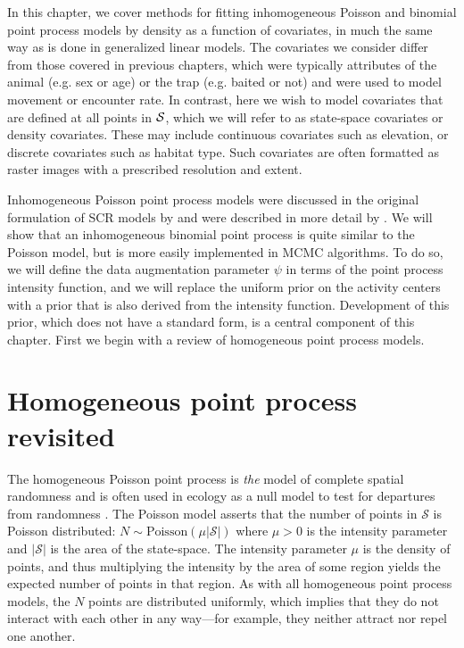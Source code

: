 In this chapter, we cover methods %
for fitting inhomogeneous Poisson and binomial
point process models by density as a
function of covariates, in much the same way as is done in generalized linear
models. The covariates we consider differ
from those covered in previous chapters, which were typically
attributes of the animal (e.g. sex or age) or the trap (e.g. baited or
not) and were used to model movement or encounter
rate. In contrast, here we wish to model covariates that are defined
at all points in $\cal S$, which we will refer to as
state-space covariates or density covariates. These may
include continuous covariates such as elevation, or discrete
covariates such as habitat type. Such covariates are often formatted
as raster images with a prescribed resolution and extent.

Inhomogeneous Poisson point process models were discussed in the original
formulation of SCR models by \citet{efford:2004} and were described in
more detail by \citet{borchers_efford:2008}. We will show that an
inhomogeneous binomial point process is quite similar to the Poisson
model, but is more easily implemented in MCMC algorithms. To do so, we
will define the data augmentation parameter $\psi$ in terms of the point
process intensity function, and we will replace the uniform prior on the
activity centers with a prior that is also derived from the intensity
function. Development of this prior, which does not have a
standard form, is a central component of this chapter. First we
begin with a review of homogeneous point process models.


\section{Homogeneous point process revisited}

The homogeneous Poisson point process is \textit{the} model of complete
spatial randomness and is often used in ecology as a null model
to test for departures from randomness
\citep{cressie:1992, diggle:2003, illian_etal:2008}.
The Poisson model asserts that the number of points in $\mathcal{S}$ is
Poisson distributed: $N \sim \text{Poisson}(\mu|\mathcal{S}|)$ where $\mu>0$ is
the intensity parameter and $|\mathcal{S}|$ is the area of the
state-space. The intensity parameter $\mu$
is the density of points, and thus multiplying the intensity by the area
of some region yields the expected number of points in that region.
As with all homogeneous point process models, the $N$ points are
distributed uniformly, which implies that they do not interact with each other in
any way---for example, they neither attract nor repel one another.

